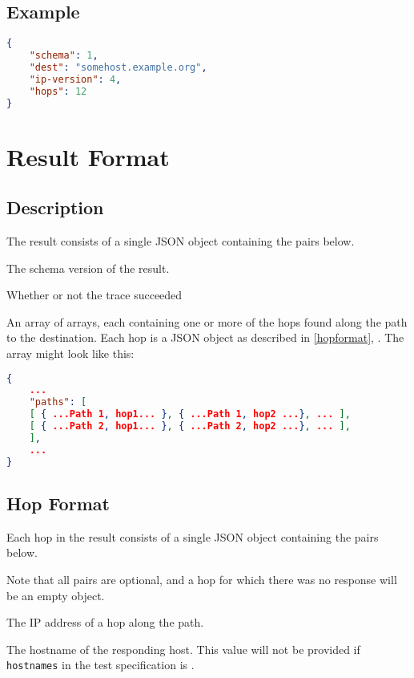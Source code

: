 \documentclass[10pt]{article}
\begin{document}
\subsection{Example}
\begin{lstlisting}[language=json]
{
    "schema": 1,
    "dest": "somehost.example.org",
    "ip-version": 4,
    "hops": 12
}
\end{lstlisting}



%
%

\section{Result Format}

\subsection{Description}
The result consists of a single JSON object containing the pairs
below.  \seejson

 The schema version of the result.

 Whether or not the trace succeeded

 An array of arrays, each containing one or
more of the hops found along the path to the destination.  Each hop is
a JSON object as described in \autoref{hopformat},
{\it {}}.  The array might look like this:
\begin{lstlisting}[language=json]
{
    ...
    "paths": [
	[ { ...Path 1, hop1... }, { ...Path 1, hop2 ...}, ... ],
	[ { ...Path 2, hop1... }, { ...Path 2, hop2 ...}, ... ],
    ],
    ...
}
\end{lstlisting}




\subsection{Hop Format}\label{hopformat}

Each hop in the result consists of a single JSON object containing the
pairs below.  \seejson

Note that  all pairs are  optional, and a  hop for which there  was no
response will be an empty object.

 The IP address of a hop along the path.

 The hostname of the responding host.  This
value will not be provided if {\tt hostnames} in the test
specification is \false.
\end{document}
